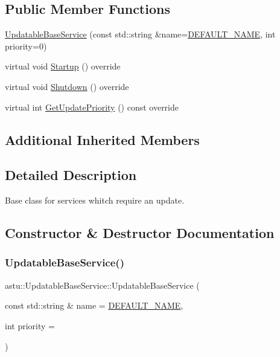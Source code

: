 \subsection*{Public Member Functions}
\begin{DoxyCompactItemize}
\item 
\hyperlink{classastu_1_1UpdatableBaseService_affb07c2699a08b42eb5b8ca96ed681c0}{Updatable\+Base\+Service} (const std\+::string \&name=\hyperlink{classastu_1_1BaseService_a9483b26ad631bd14646ef2d2170cd828}{D\+E\+F\+A\+U\+L\+T\+\_\+\+N\+A\+ME}, int priority=0)
\item 
virtual void \hyperlink{classastu_1_1UpdatableBaseService_a47e3725f717cee3cd8983f485b2a0243}{Startup} () override
\item 
virtual void \hyperlink{classastu_1_1UpdatableBaseService_a7ad7e0201007878b6014361dd5ba82f9}{Shutdown} () override
\item 
virtual int \hyperlink{classastu_1_1UpdatableBaseService_a22a9824510d94fa97efb962ae38be945}{Get\+Update\+Priority} () const override
\end{DoxyCompactItemize}
\subsection*{Additional Inherited Members}


\subsection{Detailed Description}
Base class for services whitch require an update. 

\subsection{Constructor \& Destructor Documentation}
\mbox{\label{classastu_1_1UpdatableBaseService_affb07c2699a08b42eb5b8ca96ed681c0}} 
\subsubsection{\texorpdfstring{Updatable\+Base\+Service()}{UpdatableBaseService()}}
{\footnotesize\ttfamily astu\+::\+Updatable\+Base\+Service\+::\+Updatable\+Base\+Service (\begin{DoxyParamCaption}\item[{const std\+::string \&}]{name = {\ttfamily \hyperlink{classastu_1_1BaseService_a9483b26ad631bd14646ef2d2170cd828}{D\+E\+F\+A\+U\+L\+T\+\_\+\+N\+A\+ME}},  }\item[{int}]{priority = {} }\end{DoxyParamCaption})}

